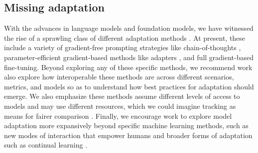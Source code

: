 \subsection{Missing adaptation}
\label{sec:missing-adaptation}

With the advances in language models and foundation models, we have witnessed the rise of a sprawling class of different adaptation methods \citep[see][\S4.3]{bommasani2021opportunities}.
At present, these include a variety of gradient-free prompting strategies \citep[see][]{liu2022prompt} like chain-of-thoughts \citep{wei2022chain}, parameter-efficient gradient-based methods \citep[see][]{he2022towards} like adapters \citep{houlsby2019parameter}, and full gradient-based fine-tuning.
Beyond exploring any of these specific methods, we recommend work also explore how interoperable these methods are across different scenarios, metrics, and models so as to understand how best practices for adaptation should emerge.
We also emphasize these methods assume different levels of access to models and may use different resources, which we could imagine tracking as means for fairer comparison \citep[][\S4.2]{perez2021true, bommasani2021opportunities}.
Finally, we encourage work to explore model adaptation more expansively beyond specific machine learning methods, such as new modes of interaction that empower humans and broader forms of adaptation such as continual learning \citep[see][\S2.5, \S4.3]{bommasani2021opportunities}. 
